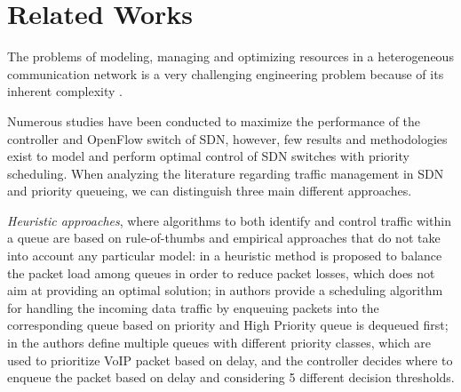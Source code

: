 

\section*{Related Works} \label{RelWorks}
The problems of modeling, managing and optimizing resources in a heterogeneous communication network is a very challenging engineering problem because of its inherent complexity \cite{Neely2010,Lemeshko2019,Tan2017,Abdelmoniem2019}.

Numerous studies have been conducted to maximize the performance of the controller and OpenFlow switch of SDN, however, few results and methodologies exist to model and perform optimal control of SDN switches with priority scheduling. When analyzing the literature regarding traffic management in SDN and priority queueing, we can distinguish three main different approaches.

\textit{Heuristic approaches}, where algorithms to both identify and control traffic within a queue are based on rule-of-thumbs and empirical approaches that do not take into account any particular model: in \cite{Boero2016} a heuristic method is proposed to balance the packet load among queues in order to reduce packet losses, which does not aim at providing an optimal solution; in \cite{Umadevi} authors provide a scheduling algorithm for handling the incoming data traffic by enqueuing packets into the corresponding queue based on priority and High Priority queue is dequeued first; in \cite{Olariu} the authors define multiple queues with different priority classes, which are used to prioritize VoIP packet based on delay, and the controller decides where to enqueue the packet based on delay and considering 5 different decision thresholds.
  
